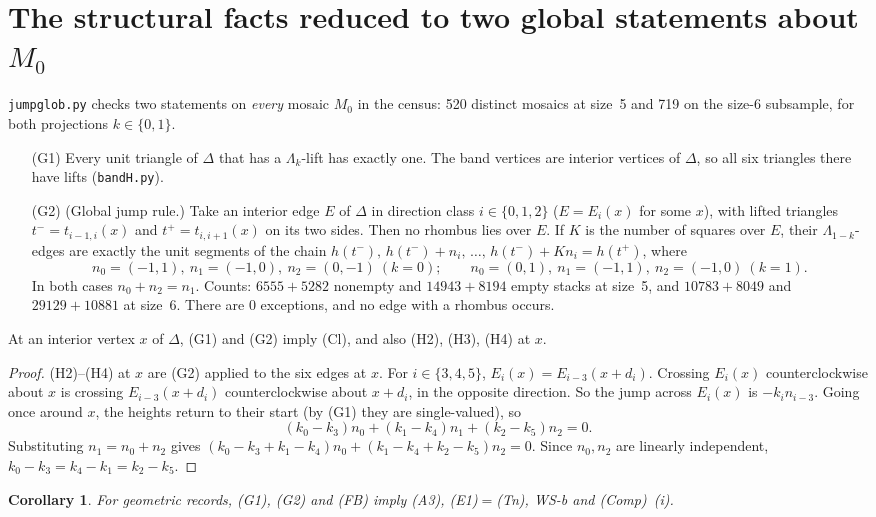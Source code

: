 \documentclass[11pt]{article}
\newtheorem{corollary}[theorem]{Corollary}
\theoremstyle{definition}\newtheorem{definition}[theorem]{Definition}\newtheorem{remark}[theorem]{Remark}
\begin{document}
\section{The structural facts reduced to two global statements about $M_0$}\label{sec:glob}
\texttt{jumpglob.py} checks two statements on \emph{every} mosaic $M_0$ in the census: 520 distinct mosaics at size~5 and 719 on the size-6 subsample, for both projections $k\in\{0,1\}$.
\begin{itemize}
\item[(G1)] Every unit triangle of $\Delta$ that has a $\Lambda_k$-lift has exactly one. The band vertices are interior vertices of $\Delta$, so all six triangles there have lifts (\texttt{bandH.py}).
\item[(G2)] (Global jump rule.) Take an interior edge $E$ of $\Delta$ in direction class $i\in\{0,1,2\}$ ($E=E_i(x)$ for some $x$), with lifted triangles $t^-=t_{i-1,i}(x)$ and $t^+=t_{i,i+1}(x)$ on its two sides. Then no rhombus lies over $E$. If $K$ is the number of squares over $E$, their $\Lambda_{1-k}$-edges are exactly the unit segments of the chain $h(t^-),\,h(t^-)+n_i,\,\dots,\,h(t^-)+Kn_i=h(t^+)$, where
\[n_0=(-1,1),\ n_1=(-1,0),\ n_2=(0,-1)\ (k=0);\qquad n_0=(0,1),\ n_1=(-1,1),\ n_2=(-1,0)\ (k=1).\]
In both cases $n_0+n_2=n_1$. Counts: $6555+5282$ nonempty and $14943+8194$ empty stacks at size~5, and $10783+8049$ and $29129+10881$ at size~6. There are 0 exceptions, and no edge with a rhombus occurs.
\end{itemize}
\begin{lemma}\label{lem:cl}
At an interior vertex $x$ of $\Delta$, (G1) and (G2) imply (Cl), and also (H2), (H3), (H4) at $x$.
\end{lemma}
\begin{proof}
(H2)--(H4) at $x$ are (G2) applied to the six edges at $x$. For $i\in\{3,4,5\}$, $E_i(x)=E_{i-3}(x+d_i)$. Crossing $E_i(x)$ counterclockwise about $x$ is crossing $E_{i-3}(x+d_i)$ counterclockwise about $x+d_i$, in the opposite direction. So the jump across $E_i(x)$ is $-k_i n_{i-3}$. Going once around $x$, the heights return to their start (by (G1) they are single-valued), so
\[(k_0-k_3)n_0+(k_1-k_4)n_1+(k_2-k_5)n_2=0.\]
Substituting $n_1=n_0+n_2$ gives $(k_0-k_3+k_1-k_4)n_0+(k_1-k_4+k_2-k_5)n_2=0$. Since $n_0,n_2$ are linearly independent, $k_0-k_3=k_4-k_1=k_2-k_5$.
\end{proof}
\begin{corollary}\label{cor:glob}
For geometric records, (G1), (G2) and (FB) imply (A3), (E1)$=$(Tn), WS-b and (Comp)~(i).
\end{corollary}
\end{document}
